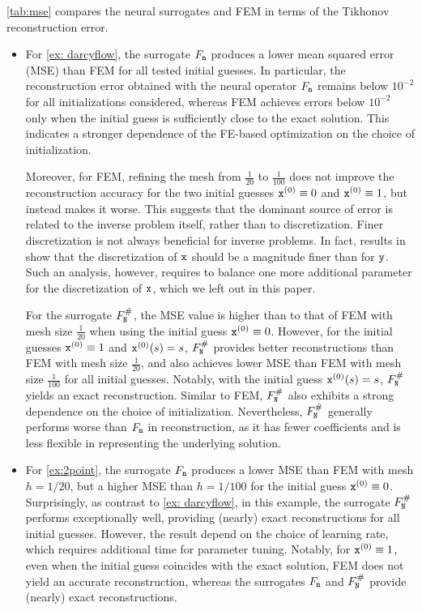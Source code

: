 \documentclass[10pt]{article}
\numberwithin{equation}{section}
\theoremstyle{nonumberplain}
\newcommand{\y}{{\tt y}}
\newcommand{\n}{{\tt n}}
\newcommand{\x}{{\tt x}}
\newcommand{\no}{{\tt N}}
\begin{document}
\autoref{tab:mse} compares the neural surrogates and FEM in terms of the Tikhonov reconstruction error.
\begin{itemize}   
    \item For \autoref{ex: darcyflow}, the surrogate $F_\n$ produces a lower mean squared error (MSE) than FEM for all tested initial guesses. In particular, the reconstruction error obtained with the neural operator $F_\n$ remains below $10^{-2}$ for all initializations considered, whereas FEM achieves errors below $10^{-2}$ only when the initial guess is sufficiently close to the exact solution. This indicates a stronger dependence of the FE-based optimization on the choice of initialization.
    
    Moreover, for FEM, refining the mesh from  $\frac{1}{20}$ to $\frac{1}{100}$ does not improve the reconstruction accuracy for the two initial guesses $\x^{(0)} \equiv 0$ and $\x^{(0)} \equiv 1$, but instead makes it worse. This suggests that the dominant source of error is related to the inverse problem itself, rather than to discretization. Finer discretization is not always beneficial for inverse problems. In fact, results in \cite{NeuSch90} show that the discretization of $\x$ should be a magnitude finer than for $\y$. Such an analysis, however, requires to balance one more additional parameter for the discretization of $\x$, which we left out in this paper.

    For the surrogate $F_\no^\#$, the MSE value is higher than to that of FEM with mesh size $\frac{1}{20}$ when using the initial guess $\x^{(0)} \equiv 0$. However, for the initial guesses $\x^{(0)} \equiv 1$ and $\x^{(0)}(s) = s$, $F_\no^\#$ provides better reconstructions than FEM with mesh size $\frac{1}{20}$, and also achieves lower MSE than FEM with mesh size $\frac{1}{100}$ for all initial guesses. Notably, with the initial guess $\x^{(0)}(s) = s$, $F_\no^\#$ yields an exact reconstruction. Similar to FEM, $F_\no^\#$ also exhibits a strong dependence on the choice of initialization. Nevertheless, $F_\no^\#$ generally performs worse than $F_\n$ in reconstruction, as it has fewer coefficients and is less flexible in representing the underlying solution.

    \item For \autoref{ex:2point}, the surrogate $F_\n$ produces a lower MSE than FEM with mesh $h = 1/20$, but a higher MSE than $h = 1/100$ for the initial guess $\x^{(0)} \equiv 0$. Surprisingly, as contrast to \autoref{ex: darcyflow}, in this example, the surrogate $F_\no^\#$ performs exceptionally well, providing (nearly) exact reconstructions for all initial guesses. However, the result depend on the choice of learning rate, which requires additional time for parameter tuning. Notably, for $\x^{(0)} \equiv 1$, even when the initial guess coincides with the exact solution, FEM does not yield an accurate reconstruction, whereas the surrogates $F_\n$ and $F_\no^\#$ provide (nearly) exact reconstructions. 


\end{itemize}
\end{document}
